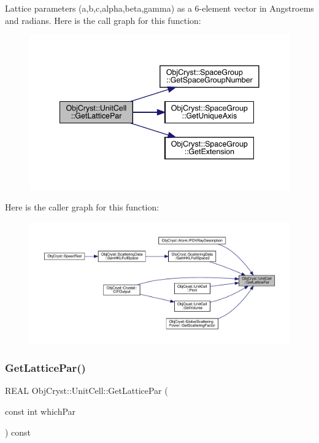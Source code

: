 Lattice parameters (a,b,c,alpha,beta,gamma) as a 6-\/element vector in Angstroems and radians. Here is the call graph for this function\+:
\nopagebreak
\begin{figure}[H]
\begin{center}
\leavevmode
\includegraphics[width=341pt]{class_obj_cryst_1_1_unit_cell_a176768bac4762fa188a0e30c255c19fb_cgraph}
\end{center}
\end{figure}
Here is the caller graph for this function\+:
\nopagebreak
\begin{figure}[H]
\begin{center}
\leavevmode
\includegraphics[width=350pt]{class_obj_cryst_1_1_unit_cell_a176768bac4762fa188a0e30c255c19fb_icgraph}
\end{center}
\end{figure}
\mbox{\label{class_obj_cryst_1_1_unit_cell_a1f5687e68709cd764f12d4128c8b6492}} 
\subsubsection{\texorpdfstring{GetLatticePar()}{GetLatticePar()}\hspace{0.1cm}{\footnotesize\ttfamily [2/2]}}
{\footnotesize\ttfamily R\+E\+AL Obj\+Cryst\+::\+Unit\+Cell\+::\+Get\+Lattice\+Par (\begin{DoxyParamCaption}\item[{const int}]{which\+Par }\end{DoxyParamCaption}) const}

